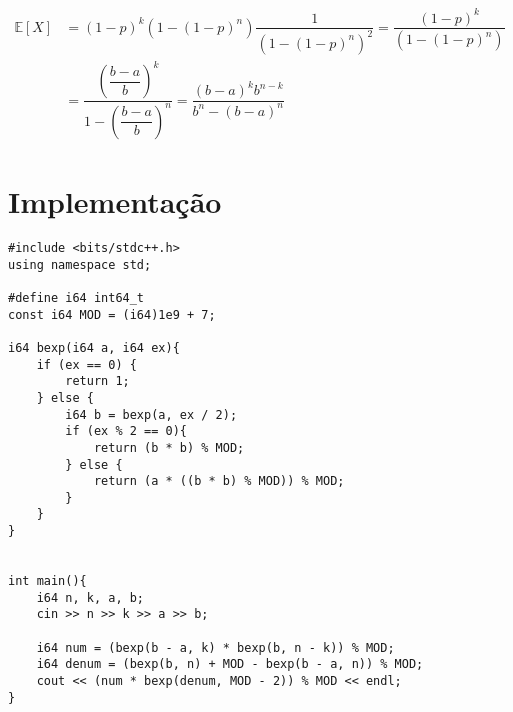 \documentclass{article}
\begin{document}
    \begin{align*}
        \mathbb{E}[X]
        &= (1 - p)^{k}(1 - (1 - p)^n)\dfrac{1}{\left(1 - \left(1 - p\right)^n\right)^2}
        = \dfrac{(1 - p)^{k}}{(1 - (1 - p)^n)}
        \\
        &= \dfrac{\left(\dfrac{b - a}{b}\right)^{k}}{1 - \left(\dfrac{b - a}{b}\right)^n}
        = \dfrac{(b - a)^{k}b^{n - k}}{b^n - (b - a)^n}
    \end{align*}

    \section{Implementação}

    \begin{verbatim}
#include <bits/stdc++.h>
using namespace std;
    
#define i64 int64_t
const i64 MOD = (i64)1e9 + 7;
    
i64 bexp(i64 a, i64 ex){
    if (ex == 0) {
        return 1;
    } else {
        i64 b = bexp(a, ex / 2);
        if (ex % 2 == 0){
            return (b * b) % MOD;
        } else {
            return (a * ((b * b) % MOD)) % MOD;
        }
    }
}
    
    
int main(){
    i64 n, k, a, b;
    cin >> n >> k >> a >> b;
    
    i64 num = (bexp(b - a, k) * bexp(b, n - k)) % MOD;
    i64 denum = (bexp(b, n) + MOD - bexp(b - a, n)) % MOD;
    cout << (num * bexp(denum, MOD - 2)) % MOD << endl;
}
    \end{verbatim}
\end{document}
